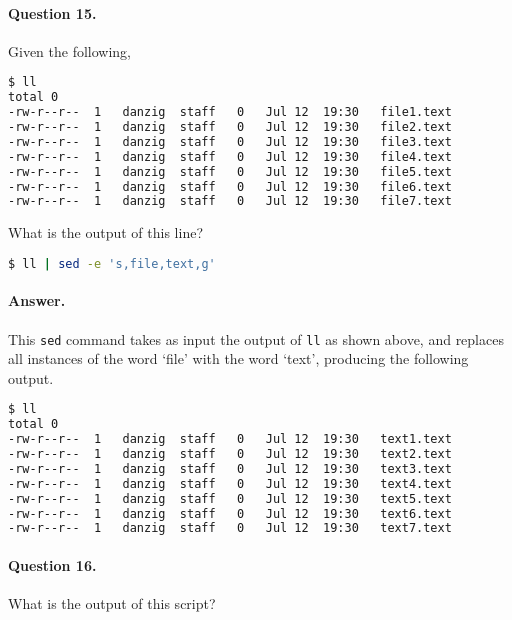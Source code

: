 \documentclass{article}
\begin{document}
\paragraph{Question 15.} Given the following,

\begin{lstlisting}[language=bash]
$ ll
total 0
-rw-r--r--	1	danzig	staff	0	Jul 12	19:30	file1.text
-rw-r--r--	1	danzig	staff	0	Jul 12	19:30	file2.text
-rw-r--r--	1	danzig	staff	0	Jul 12	19:30	file3.text
-rw-r--r--	1	danzig	staff	0	Jul 12	19:30	file4.text
-rw-r--r--	1	danzig	staff	0	Jul 12	19:30	file5.text
-rw-r--r--	1	danzig	staff	0	Jul 12	19:30	file6.text
-rw-r--r--	1	danzig	staff	0	Jul 12	19:30	file7.text
\end{lstlisting}

What is the output of this line?

\begin{lstlisting}[language=bash]
$ ll | sed -e 's,file,text,g'
\end{lstlisting}

\paragraph{Answer.} This \verb`sed` command takes as input the output of \verb`ll` as shown above, and replaces all instances of the word `file' with the word `text', producing the following output.

\begin{lstlisting}[language=bash]
$ ll
total 0
-rw-r--r--	1	danzig	staff	0	Jul 12	19:30	text1.text
-rw-r--r--	1	danzig	staff	0	Jul 12	19:30	text2.text
-rw-r--r--	1	danzig	staff	0	Jul 12	19:30	text3.text
-rw-r--r--	1	danzig	staff	0	Jul 12	19:30	text4.text
-rw-r--r--	1	danzig	staff	0	Jul 12	19:30	text5.text
-rw-r--r--	1	danzig	staff	0	Jul 12	19:30	text6.text
-rw-r--r--	1	danzig	staff	0	Jul 12	19:30	text7.text
\end{lstlisting}

\paragraph{Question 16.} What is the output of this script?

\begin{lstlisting}[language=bash]

\end{lstlisting}
\end{document}
